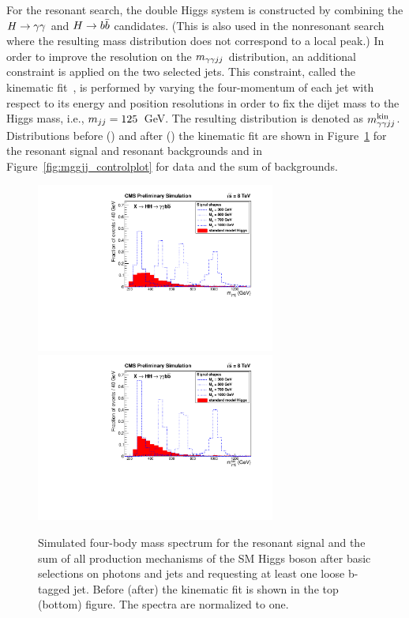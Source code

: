 For the resonant search, the double Higgs system is constructed
by combining the $H\to\gamma\gamma$ and $H\to b\bar{b}$ candidates. (This is also used in the nonresonant search
where the resulting mass distribution does not correspond to a local peak.)
In order to improve the resolution on the $m_{\gamma\gamma jj}$ distribution, an additional constraint
is applied on the two selected jets.
This constraint, called the kinematic fit~\cite{Chatrchyan:2013yoa},
is performed by varying the four-momentum of each jet with respect to its energy and position
resolutions in order to fix the dijet mass to the Higgs mass, i.e., $m_{jj} = 125$~GeV.
The resulting distribution is denoted as $m_{\gamma\gamma jj}^{\rm kin}$. Distributions before (\Mggjj) and after (\Mggjjk)
the kinematic fit
are shown in Figure~\ref{fig:mggjj_onlyhiggs} for the resonant signal and resonant backgrounds
and in Figure~\ref{fig:mggjj_controlplot} for data and the sum of backgrounds.

\begin{figure}[ht]
 \begin{center}
   \includegraphics[width=0.70\textwidth]{figures/selection/TotalMass_OnlyHiggs.pdf}
   \includegraphics[width=0.70\textwidth]{figures/selection/TotalMassKinFit_OnlyHiggs.pdf}
 \end{center}
\caption{Simulated four-body mass spectrum for the resonant signal and the sum of all production
mechanisms of the
SM Higgs boson after basic selections on photons and jets and requesting at least
one loose b-tagged jet. Before (after) the kinematic fit is shown in the top (bottom) figure.
The spectra are normalized to one.}
\label{fig:mggjj_onlyhiggs}
\end{figure}

